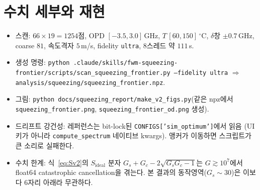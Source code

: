 \documentclass[11pt,a4paper]{article}
\newcommand{\GHz}{\,\mathrm{GHz}}
\newcommand{\degC}{\,^{\circ}\mathrm{C}}
\begin{document}
\section{수치 세부와 재현}
\begin{itemize}[nosep]
\item 스캔: $66\times19=1254$점, OPD $[-3.5,3.0]\GHz$, $T\,[60,150]\degC$, $\delta$창 $\pm0.7\GHz$,
      coarse $81$, 속도격자 $5\,$m/s, fidelity \texttt{ultra}, 8스레드 약 $111\,$s.
\item 생성 명령: \texttt{python .claude/skills/fwm-squeezing-frontier/scripts/scan\_squeezing\_frontier.py
      --fidelity ultra} $\Rightarrow$ \texttt{analysis/squeezing/squeezing\_frontier.npz}.
\item 그림: \texttt{python docs/squeezing\_report/make\_v2\_figs.py}(같은 npz에서
      \texttt{squeezing\_frontier.png}, \texttt{squeezing\_frontier\_od.png} 생성).
\item 드리프트 강건성: 레퍼런스는 bit-lock된 \texttt{CONFIGS['sim\_optimum']}에서 읽음
      (UI 키가 아니라 \texttt{compute\_spectrum} 네이티브 kwargs). 앵커가 이동하면 스크립트가
      큰 소리로 실패한다.
\item 수치 한계: 식~\eqref{eq:Sv2}의 $S_{\mathrm{ideal}}$ 분자 $G_s+G_c-2\sqrt{G_sG_c-1}$는
      $G\gtrsim10^7$에서 float64 catastrophic cancellation을 겪는다. 본 결과의 동작영역($G_s\sim30$)은
      이보다 6자리 아래라 무관하다.
\end{itemize}
\end{document}

